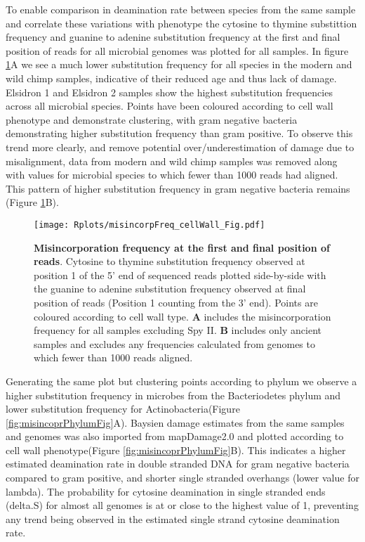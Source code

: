\documentclass[12pt, a4paper]{article}
\begin{document}
To enable comparison in deamination rate between species from the same sample and correlate these variations with phenotype the cytosine to thymine substittion frequency and guanine to adenine substitution frequency at the first and final position of reads for all microbial genomes was plotted for all samples. 
In figure \ref{fig:misincoprCellWallFig}A we see a much lower substitution frequency for all species in the modern and wild chimp samples, indicative of their reduced age and thus lack of damage. 
Elsidron 1 and Elsidron 2 samples show the highest substitution frequencies across all microbial species.
Points have been coloured according to cell wall phenotype and demonstrate clustering, with gram negative bacteria demonstrating higher substitution frequency than gram positive. 
To observe this trend more clearly, and remove potential over/underestimation of damage due to misalignment, data from modern and wild chimp samples was removed along with values for microbial species to which fewer than 1000 reads had aligned.
This pattern of higher substitution frequency in gram negative bacteria remains (Figure \ref{fig:misincoprCellWallFig}B).

\begin{figure}[ht!]
	\centering
	\texttt{[image: Rplots/misincorpFreq\_cellWall\_Fig.pdf]}
	\small\caption{\textbf{Misincorporation frequency at the first and final position of reads}. Cytosine to thymine substitution frequency observed at position 1 of the 5' end of sequenced reads plotted side-by-side with the guanine to adenine substitution frequency observed at final position of reads (Position 1 counting from the 3' end). Points are coloured according to cell wall type. \textbf{A} includes the misincorporation frequency for all samples excluding Spy II. \textbf{B} includes only ancient samples and excludes any frequencies calculated from genomes to which fewer than 1000 reads aligned.}\label{fig:misincoprCellWallFig}
\end{figure}

Generating the same plot but clustering points according to phylum we observe a higher substitution frequency in microbes from the Bacteriodetes phylum and lower substitution frequency for Actinobacteria(Figure \ref{fig:misincoprPhylumFig}A).
Baysien damage estimates from the same samples and genomes was also imported from mapDamage2.0 and plotted according to cell wall phenotype(Figure \ref{fig:misincoprPhylumFig}B). 
This indicates a higher estimated deamination rate in double stranded DNA for gram negative bacteria compared to gram positive, and shorter single stranded overhangs (lower value for lambda).
The probability for cytosine deamination in single stranded ends (delta.S) for almost all genomes is at or close to the highest value of 1, preventing any trend being observed in the estimated single strand cytosine deamination rate.
\end{document}
